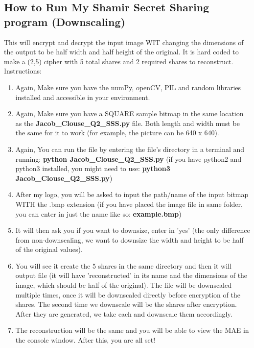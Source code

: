 \documentclass[10pt]{article}
\begin{document}
\subsection{How to Run My Shamir Secret Sharing program (Downscaling) } 
\noindent This will encrypt and decrypt the input image WIT changing the dimensions of the output to be half width and half height of the original. It is hard coded to make a (2,5) cipher with 5 total shares and 2 required shares to reconstruct. \\ Instructions: 
\begin{enumerate}
	\item Again, Make sure you have the numPy, openCV, PIL and random libraries installed and accessible in your environment.
	
	\item Again, Make sure you have a SQUARE sample bitmap in the same location as the \textbf{Jacob\_Clouse\_Q2\_SSS.py} file. Both length and width must be the same for it to work (for example, the picture can be 640 x 640).
	
	\item Again, You can run the file by entering the file's directory in a terminal and running: \textbf{python Jacob\_Clouse\_Q2\_SSS.py} (if you have python2 and python3 installed, you might need to use: \textbf{python3 Jacob\_Clouse\_Q2\_SSS.py})
	
	\item After my logo, you will be asked to input the path/name of the input bitmap WITH the .bmp extension (if you have placed the image file in same folder, you can enter in just the name like so: \textbf{example.bmp})
	
	\item It will then ask you if you want to downsize, enter in 'yes' (the only difference from non-downscaling, we want to downsize the width and height to be half of the original values). 
	
	\item You will see it create the 5 shares in the same directory and then it will output file (it will have 'reconstructed' in its name and the dimensions of the image, which should be half of the original). 
	\subitem The file will be downscaled multiple times, once it will be downscaled directly before encryption of the shares. 
	\subitem The second time we downscale will be the shares after encryption. After they are generated, we take each and downscale them accordingly.
	
	\item The reconstruction will be the same and you will be able to view the MAE in the console window. After this, you are all set!
	
\end{enumerate}

\vspace{0.2in}
\end{document}
